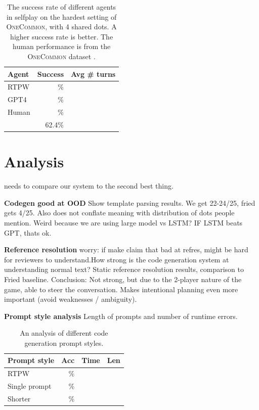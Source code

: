 \documentclass[11pt]{article}
\newcommand{\system}{RTPW}
\begin{document}
\begin{table}[!t]
\centering
\begin{tabular}{lrr}
\toprule
Agent                   & Success & Avg \# turns\\
\midrule
\system{}               & \%        & \\
GPT4                    & \%  & \\
Human                   & \%  & \\
\citet{fried}           & 62.4\%  & \\
\bottomrule
\end{tabular}
\caption{\label{tbl:selfplay}
The success rate of different agents in selfplay on the hardest setting of \textsc{OneCommon}, with 4 shared dots.
A higher success rate is better.
The human performance is from the \textsc{OneCommon} dataset
\citep{onecommon}.
}
\end{table}

\section{Analysis}
needs to compare our system to the 
second best thing.

\textbf{Codegen good at OOD}
Show template parsing results.
We get 22-24/25, fried gets 4/25.
Also does not conflate meaning with distribution of dots people mention.
Weird because we are using large model vs LSTM?
IF LSTM beats GPT, thats ok.

\textbf{Reference resolution}
worry: if make claim that bad at refres, might be hard for reviewers to understand.How strong is the code generation system at understanding normal text?
Static reference resolution results, comparison to Fried baseline.
Conclusion: Not strong, but due to the 2-player nature of the game,
able to steer the conversation.
Makes intentional planning even more important (avoid weaknesses / ambiguity).




\textbf{Prompt style analysis}
Length of prompts and number of runtime errors.

\begin{table}[!t]
\centering
\begin{tabular}{lrrr}
\toprule
Prompt style                   & Acc & Time & Len\\
\midrule
\system{}                      & \%  &    &  \\
Single prompt                  & \%  &    & \\
Shorter                        & \%  &    &  \\
\bottomrule
\end{tabular}
\caption{\label{tbl:prompt}
An analysis of different code generation prompt styles.
}
\end{table}
\end{document}

